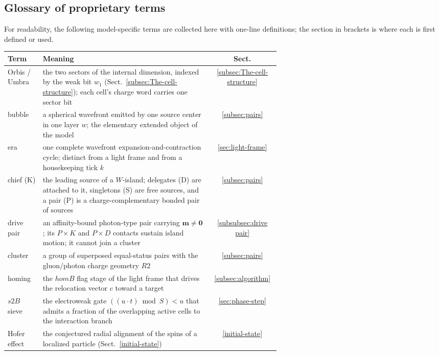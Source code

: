 \documentclass{ijuc}
\begin{document}
\subsection*{Glossary of proprietary terms}
For readability, the following model-specific terms are collected here with one-line definitions; the section in brackets is where each is first defined or used.
\begin{center}
\begin{tabular}{|l|p{0.62\linewidth}|c|}
\hline
\textbf{Term} & \textbf{Meaning} & \textbf{Sect.}\\
\hline
Orbis / Umbra & the two sectors of the internal dimension, indexed by the weak bit $w_1$ (Sect.~\ref{subsec:The-cell-structure}); each cell's charge word carries one sector bit & \ref{subsec:The-cell-structure}\\
\hline
bubble & a spherical wavefront emitted by one source center in one layer $w$; the elementary extended object of the model & \ref{subsec:pairs}\\
\hline
era & one complete wavefront expansion-and-contraction cycle; distinct from a light frame and from a housekeeping tick $k$ & \ref{sec:light-frame}\\
\hline
chief (K) & the leading source of a $W$-island; delegates (D) are attached to it, singletons (S) are free sources, and a pair (P) is a charge-complementary bonded pair of sources & \ref{subsec:pairs}\\
\hline
drive pair & an affinity-bound photon-type pair carrying $\boldsymbol{m}\ne\mathbf{0}$; its $P\times K$ and $P\times D$ contacts sustain island motion; it cannot join a cluster & \ref{subsubsec:drive pair}\\
\hline
cluster & a group of superposed equal-status pairs with the gluon/photon charge geometry $R2$ & \ref{subsec:pairs}\\
\hline
homing & the $homB$ flag stage of the light frame that drives the relocation vector $c$ toward a target & \ref{subsec:algorithm}\\
\hline
$s2B$ sieve & the electroweak gate $((u\cdot t)\bmod S)<u$ that admits a fraction of the overlapping active cells to the interaction branch & \ref{sec:phase-step}\\
\hline
Hofer effect & the conjectured radial alignment of the spins of a localized particle (Sect.~\ref{initial-state}) & \ref{initial-state}\\
\hline
\end{tabular}
\end{center}
\end{document}
